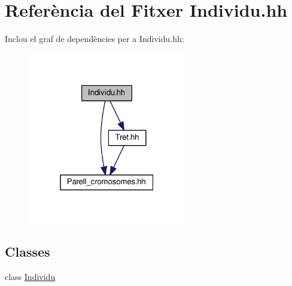 \hypertarget{_individu_8hh}{}\section{Referència del Fitxer Individu.\+hh}
\label{_individu_8hh}
Inclou el graf de dependències per a Individu.\+hh\+:
\nopagebreak
\begin{figure}[H]
\begin{center}
\leavevmode
\includegraphics[width=196pt]{_individu_8hh__incl}
\end{center}
\end{figure}
\subsection*{Classes}
\begin{DoxyCompactItemize}
\item 
class \hyperlink{class_individu}{Individu}
\end{DoxyCompactItemize}
